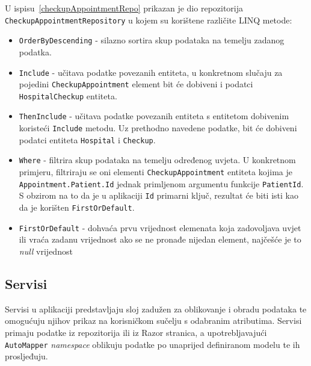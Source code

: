 U ispisu~\ref{checkupAppointmentRepo} prikazan je dio repozitorija \texttt{CheckupAppointmentRepository} u kojem su korištene različite LINQ metode:

\begin{itemize}
\item \texttt{OrderByDescending} - silazno sortira skup podataka na temelju zadanog podatka.

\item \texttt{Include} - učitava podatke povezanih entiteta, u konkretnom slučaju za pojedini \texttt{CheckupAppointment} element bit će dobiveni i podatci \\\texttt{HospitalCheckup} entiteta.

\item \texttt{ThenInclude} - učitava podatke povezanih entiteta s entitetom dobivenim koristeći \texttt{Include} metodu. Uz prethodno navedene podatke, bit će dobiveni podatci entiteta \texttt{Hospital} i \texttt{Checkup}.

\item \texttt{Where} - filtrira skup podataka na temelju određenog uvjeta. U konkretnom primjeru, filtriraju se oni elementi \texttt{CheckupAppointment} entiteta kojima je \\\texttt{Appointment.Patient.Id} jednak primljenom argumentu funkcije \texttt{PatientId}. S obzirom na to da je u aplikaciji \texttt{Id} primarni ključ, rezultat će biti isti kao da je korišten \texttt{FirstOrDefault}.

\item \texttt{FirstOrDefault} - dohvaća prvu vrijednost elemenata koja zadovoljava uvjet ili vraća zadanu vrijednost ako se ne pronađe nijedan element, najčešće je to \textit{null} vrijednost
\end{itemize}

\subsection{Servisi}

Servisi u aplikaciji predstavljaju sloj zadužen za oblikovanje i obradu podataka te omogućuju njihov prikaz na korisničkom sučelju s odabranim atributima. Servisi primaju podatke iz repozitorija ili iz Razor stranica, a upotrebljavajući \texttt{AutoMapper} \textit{namespace} oblikuju podatke po unaprijed definiranom modelu te ih prosljeđuju. 

